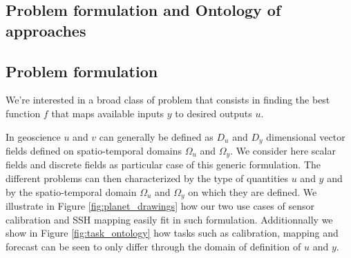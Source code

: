 \begin{bibunit}

\clearemptydoublepage
\chapter{Problem formulation and Ontology of approaches}
\label{chap:1}

\section{Problem formulation}
  \label{sec:chap1_problem_form}
We're interested in a broad class of problem that consists in finding the best function $f$ that maps available inputs $y$ to desired outputs $u$.

In geoscience $u$ and $v$ can generally be defined as $D_u$ and $D_y$ dimensional vector fields defined on spatio-temporal domains $\Omega_u$ and $\Omega_y$.
We consider here scalar fields and discrete fields as particular case of this generic formulation.
The different problems can then characterized by the type of quantities $u$ and $y$ and by the spatio-temporal domain $\Omega_u$ and $\Omega_y$ on which they are defined.
  We illustrate in Figure \ref{fig:planet_drawings} how our two use cases of sensor calibration and SSH mapping easily fit in such formulation.
  Additionnally we show in Figure \ref{fig:task_ontology} how tasks such as calibration, mapping and forecast can be seen to only differ through the domain of definition of $u$ and $y$.


\end{bibunit}
